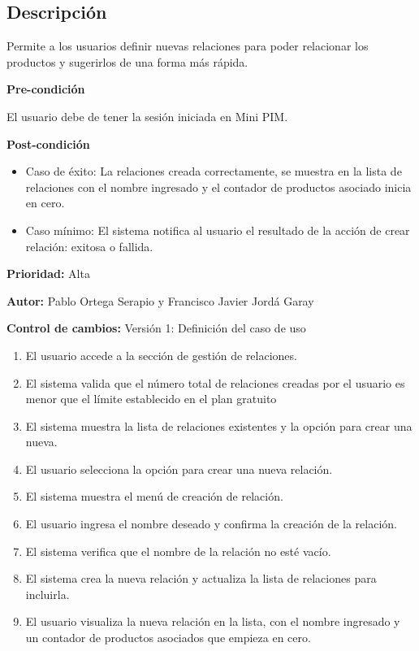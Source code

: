 
\subsection*{Descripción}
Permite a los usuarios definir nuevas relaciones para poder relacionar los productos y sugerirlos de una forma más rápida.\par
\vspace{0.15cm}

\textbf{Pre-condición}\par
El usuario debe de tener la sesión iniciada en Mini PIM.\par
\vspace{0.15cm}

\textbf{Post-condición}
\begin{itemize}
    \item Caso de éxito: La relaciones creada correctamente, se muestra en la lista de relaciones con el nombre ingresado y el contador de productos asociado inicia en cero.
    \item Caso mínimo: El sistema notifica al usuario el resultado de la acción de crear relación: exitosa o fallida.
\end{itemize}

\textbf{Prioridad: }
Alta
\vspace{0.15cm}

\textbf{Autor: }
Pablo Ortega Serapio y Francisco Javier Jordá Garay\par
\vspace{0.15cm}

\textbf{Control de cambios: } Versión 1: Definición del caso de uso

\begin{enumerate}
    \item El usuario accede a la sección de gestión de relaciones.
    \item El sistema valida que el número total de relaciones creadas por el usuario es menor que el límite establecido en el plan gratuito
    \item El sistema muestra la lista de relaciones existentes y la opción para crear una nueva.
    \item El usuario selecciona la opción para crear una nueva relación.
    \item El sistema muestra el menú de creación de relación.
    \item El usuario ingresa el nombre deseado y confirma la creación de la relación.
    \item El sistema verifica que el nombre de la relación no esté vacío.
    \item El sistema crea la nueva relación y actualiza la lista de relaciones para incluirla.
    \item El usuario visualiza la nueva relación en la lista, con el nombre ingresado y un contador de productos asociados que empieza en cero.
\end{enumerate}

